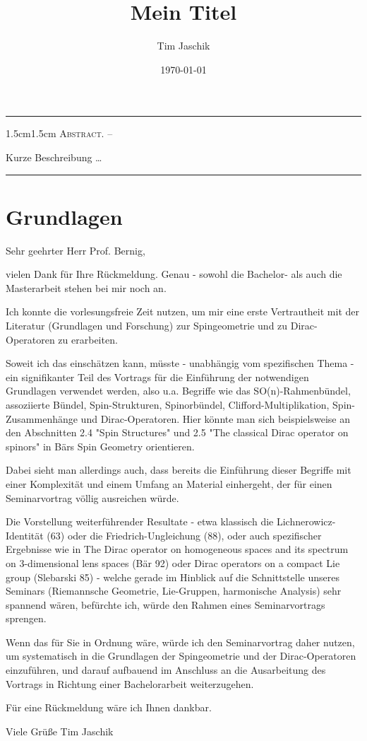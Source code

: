 \documentclass[10pt, letterpaper]{article}
\title{Mein Titel}
\author{Tim Jaschik}
\date{\today}
\renewenvironment{abstract}
  {
    \begin{adjustwidth}{1.5cm}{1.5cm}
    \small
    \textsc{Abstract. –}%
  }
  {
    \end{adjustwidth}
  }
\begin{document}
\maketitle
\rule{\textwidth}{0.5pt}
\begin{abstract}
Kurze Beschreibung …
\end{abstract}
\rule{\textwidth}{0.5pt}
\vspace{0.5cm}


\section{Grundlagen}


Sehr geehrter Herr Prof. Bernig,

vielen Dank für Ihre Rückmeldung. Genau - sowohl die Bachelor- als auch die Masterarbeit stehen bei mir noch an.

Ich konnte die vorlesungsfreie Zeit nutzen, um mir eine erste Vertrautheit mit der Literatur (Grundlagen und Forschung) zur Spingeometrie und zu Dirac-Operatoren zu erarbeiten.

Soweit ich das einschätzen kann, müsste - unabhängig vom spezifischen Thema - ein signifikanter Teil des Vortrags für die Einführung der notwendigen Grundlagen verwendet werden, also u.a. Begriffe wie das SO(n)-Rahmenbündel, assoziierte Bündel, Spin-Strukturen, Spinorbündel, Clifford-Multiplikation, Spin-Zusammenhänge und Dirac-Operatoren. Hier könnte man sich beispielsweise an den Abschnitten 2.4 "Spin Structures" und 2.5 "The classical Dirac operator on spinors" in Bärs Spin Geometry orientieren.

Dabei sieht man allerdings auch, dass bereits die Einführung dieser Begriffe mit einer Komplexität und einem Umfang an Material einhergeht, der für einen Seminarvortrag völlig ausreichen würde.

Die Vorstellung weiterführender Resultate - etwa klassisch die Lichnerowicz-Identität (63) oder die Friedrich-Ungleichung (88), oder auch spezifischer Ergebnisse wie in The Dirac operator on homogeneous spaces and its spectrum on 3-dimensional lens spaces (Bär 92) oder Dirac operators on a compact Lie group (Slebarski 85) - welche gerade im Hinblick auf die Schnittstelle unseres Seminars (Riemannsche Geometrie, Lie-Gruppen, harmonische Analysis) sehr spannend wären, befürchte ich, würde den Rahmen eines Seminarvortrags sprengen.

Wenn das für Sie in Ordnung wäre, würde ich den Seminarvortrag daher nutzen, um systematisch in die Grundlagen der Spingeometrie und der Dirac-Operatoren einzuführen, und darauf aufbauend im Anschluss an die Ausarbeitung des Vortrags in Richtung einer Bachelorarbeit weiterzugehen.

Für eine Rückmeldung wäre ich Ihnen dankbar.

Viele Grüße
Tim Jaschik




\pagebreak
\printbibliography
\end{document}

